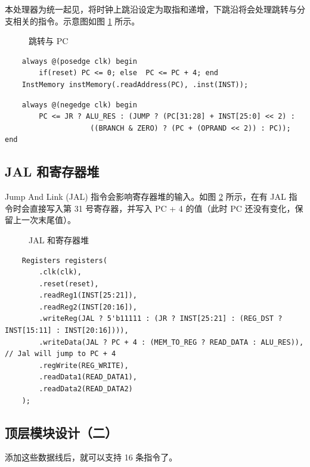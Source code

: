 \documentclass[a4paper,UTF8]{ctexart}
\begin{document}
本处理器为统一起见，将时钟上跳沿设定为取指和递增，下跳沿将会处理跳转与分支相关的指令。示意图如图 \ref{fig:jr} 所示。

\begin{figure}[H]
    \centering
    
    \caption{跳转与 PC}
    \label{fig:jr}
\end{figure}

\begin{lstlisting}
    always @(posedge clk) begin
        if(reset) PC <= 0; else  PC <= PC + 4; end
    InstMemory instMemory(.readAddress(PC), .inst(INST));
\end{lstlisting}

\begin{lstlisting}
    always @(negedge clk) begin
        PC <= JR ? ALU_RES : (JUMP ? (PC[31:28] + INST[25:0] << 2) : 
                    ((BRANCH & ZERO) ? (PC + (OPRAND << 2)) : PC)); end
\end{lstlisting}

\subsection{JAL 和寄存器堆}

Jump And Link (JAL) 指令会影响寄存器堆的输入。如图 \ref{fig:jal} 所示，在有 JAL 指令时会直接写入第 31 号寄存器，并写入 PC + 4 的值（此时 PC 还没有变化，保留上一次末尾值）。

\begin{figure}[h]
    \centering
    
    \caption{JAL 和寄存器堆}
    \label{fig:jal}
\end{figure}

\begin{lstlisting}
    Registers registers(
        .clk(clk),
        .reset(reset),
        .readReg1(INST[25:21]),
        .readReg2(INST[20:16]),
        .writeReg(JAL ? 5'b11111 : (JR ? INST[25:21] : (REG_DST ? INST[15:11] : INST[20:16]))),
        .writeData(JAL ? PC + 4 : (MEM_TO_REG ? READ_DATA : ALU_RES)), // Jal will jump to PC + 4
        .regWrite(REG_WRITE),
        .readData1(READ_DATA1),
        .readData2(READ_DATA2)
    );
\end{lstlisting}

\subsection{顶层模块设计（二）}

添加这些数据线后，就可以支持 16 条指令了。
\end{document}
